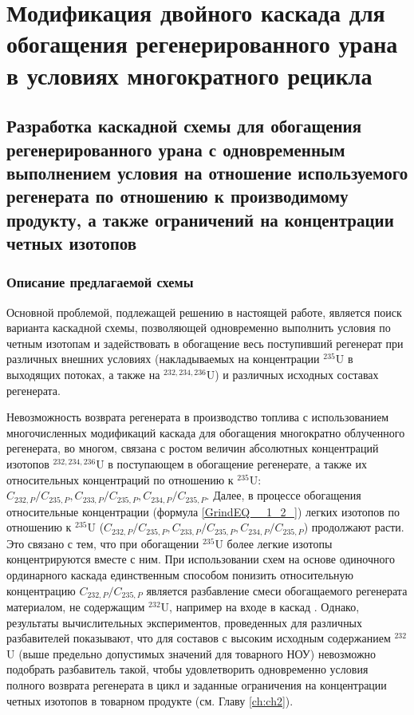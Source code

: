 \chapter{Модификация двойного каскада для обогащения регенерированного урана в условиях многократного рецикла}\label{ch:ch3}

\section{Разработка каскадной схемы для обогащения регенерированного урана с одновременным выполнением условия на отношение используемого регенерата по отношению к производимому продукту, а также ограничений на концентрации четных изотопов}
\subsection{Описание предлагаемой схемы}\label{triple_descr}

Основной проблемой, подлежащей решению в настоящей работе, является поиск варианта каскадной схемы, позволяющей одновременно выполнить условия по четным изотопам и задействовать в обогащение весь поступивший регенерат при различных внешних условиях (накладываемых на концентрации $^{235}$U в выходящих потоках, а также на $^{232,234,236}$U) и различных исходных составах регенерата.

Невозможность возврата регенерата в производство топлива с использованием многочисленных модификаций каскада для обогащения многократно облученного регенерата, во многом, связана с ростом величин абсолютных концентраций изотопов $^{232,234,236}$U в поступающем в обогащение регенерате, а также их относительных концентраций по отношению к $^{235}$U:  ${C_{232,{P}}}/{C_{235,{P}}}, {C_{233,{P}}}/{C_{235,{P}}}, {C_{234,{P}}}/{C_{235,{P}}}$. Далее, в процессе обогащения относительные концентрации (формула \ref{GrindEQ__1_2_}) легких изотопов по отношению к $^{235}$U (${C_{232,{P}}}/{C_{235,{P}}}, {C_{233,{P}}}/{C_{235,{P}}}, {C_{234,{P}}}/{C_{235,{P}}}$) продолжают расти. Это связано с тем, что при обогащении $^{235}$U более легкие изотопы концентрируются вместе с ним. При использовании схем на основе одиночного ординарного каскада единственным способом понизить относительную концентрацию ${C_{232,{P}}}/{C_{235,{P}}}$ является разбавление смеси обогащаемого регенерата материалом, не содержащим $^{232}$U, например на входе в каскад \cite{smirnovKaskadnyeShemyZadachah2012}. Однако, результаты вычислительных экспериментов, проведенных для различных разбавителей показывают, что для составов с высоким исходным содержанием $^{232}$U (выше предельно допустимых значений для товарного НОУ) невозможно подобрать разбавитель такой, чтобы удовлетворить одновременно условия полного возврата регенерата в цикл и заданные ограничения на концентрации четных изотопов в товарном продукте (см. Главу \ref{ch:ch2}). 


